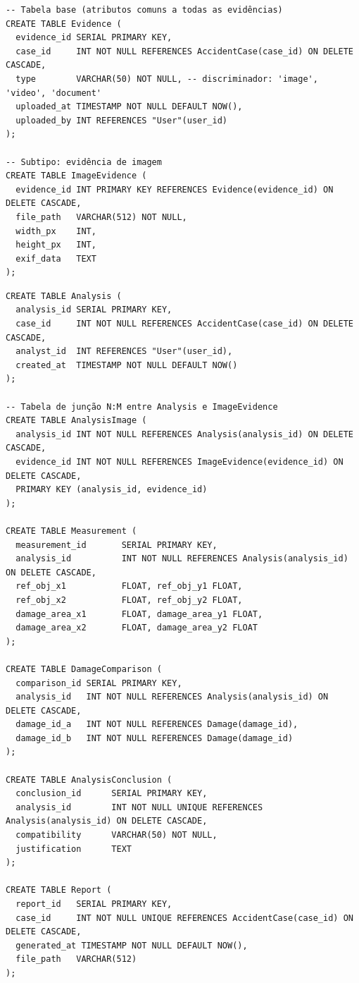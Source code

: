 \documentclass[12pt, a4paper]{article}
\begin{document}
\begin{lstlisting}[caption={Evidências -- Class Table Inheritance}]
-- Tabela base (atributos comuns a todas as evidências)
CREATE TABLE Evidence (
  evidence_id SERIAL PRIMARY KEY,
  case_id     INT NOT NULL REFERENCES AccidentCase(case_id) ON DELETE CASCADE,
  type        VARCHAR(50) NOT NULL, -- discriminador: 'image', 'video', 'document'
  uploaded_at TIMESTAMP NOT NULL DEFAULT NOW(),
  uploaded_by INT REFERENCES "User"(user_id)
);

-- Subtipo: evidência de imagem
CREATE TABLE ImageEvidence (
  evidence_id INT PRIMARY KEY REFERENCES Evidence(evidence_id) ON DELETE CASCADE,
  file_path   VARCHAR(512) NOT NULL,
  width_px    INT,
  height_px   INT,
  exif_data   TEXT
);
\end{lstlisting}

\begin{lstlisting}[caption={Análise, Medições e Conclusão}]
CREATE TABLE Analysis (
  analysis_id SERIAL PRIMARY KEY,
  case_id     INT NOT NULL REFERENCES AccidentCase(case_id) ON DELETE CASCADE,
  analyst_id  INT REFERENCES "User"(user_id),
  created_at  TIMESTAMP NOT NULL DEFAULT NOW()
);

-- Tabela de junção N:M entre Analysis e ImageEvidence
CREATE TABLE AnalysisImage (
  analysis_id INT NOT NULL REFERENCES Analysis(analysis_id) ON DELETE CASCADE,
  evidence_id INT NOT NULL REFERENCES ImageEvidence(evidence_id) ON DELETE CASCADE,
  PRIMARY KEY (analysis_id, evidence_id)
);

CREATE TABLE Measurement (
  measurement_id       SERIAL PRIMARY KEY,
  analysis_id          INT NOT NULL REFERENCES Analysis(analysis_id) ON DELETE CASCADE,
  ref_obj_x1           FLOAT, ref_obj_y1 FLOAT,
  ref_obj_x2           FLOAT, ref_obj_y2 FLOAT,
  damage_area_x1       FLOAT, damage_area_y1 FLOAT,
  damage_area_x2       FLOAT, damage_area_y2 FLOAT
);

CREATE TABLE DamageComparison (
  comparison_id SERIAL PRIMARY KEY,
  analysis_id   INT NOT NULL REFERENCES Analysis(analysis_id) ON DELETE CASCADE,
  damage_id_a   INT NOT NULL REFERENCES Damage(damage_id),
  damage_id_b   INT NOT NULL REFERENCES Damage(damage_id)
);

CREATE TABLE AnalysisConclusion (
  conclusion_id      SERIAL PRIMARY KEY,
  analysis_id        INT NOT NULL UNIQUE REFERENCES Analysis(analysis_id) ON DELETE CASCADE,
  compatibility      VARCHAR(50) NOT NULL,
  justification      TEXT
);

CREATE TABLE Report (
  report_id   SERIAL PRIMARY KEY,
  case_id     INT NOT NULL UNIQUE REFERENCES AccidentCase(case_id) ON DELETE CASCADE,
  generated_at TIMESTAMP NOT NULL DEFAULT NOW(),
  file_path   VARCHAR(512)
);
\end{lstlisting}
\end{document}
